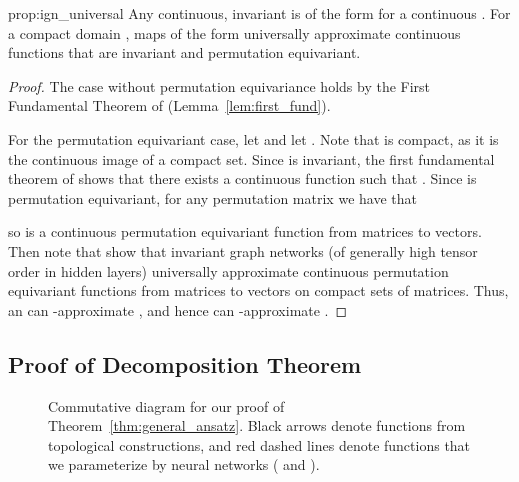 \documentclass{article} \usepackage{iclr2023_conference,times}
\newcommand{\RR}{\mathbb R}
\newcommand{\mc}[1]{\mathcal{#1}}
\newcommand{\mrm}[1]{\mathrm{#1}}
\newcommand{\dout}{d_{\mrm{out}}}
\begin{document}
\begin{repproposition}{prop:ign_universal}
    Any continuous,  invariant  is of the form  for a continuous . For a compact domain , maps of the form  universally approximate continuous functions  that are  invariant and permutation equivariant.
\end{repproposition}


\begin{proof}
    The case without permutation equivariance holds by the First Fundamental Theorem of  (Lemma~\ref{lem:first_fund}).
    
    For the permutation equivariant case, let  and let . Note that  is compact, as it is the continuous image of a compact set. Since  is  invariant, the first fundamental theorem of  shows that there exists a continuous function  such that . Since  is permutation equivariant, for any permutation matrix  we have that
    
    so  is a continuous permutation equivariant function from matrices to vectors. Then note that \cite{keriven2019universal} show that invariant graph networks (of generally high tensor order in hidden layers) universally approximate continuous permutation equivariant functions from matrices to vectors on compact sets of matrices.  Thus, an  can -approximate , and hence  can -approximate .
\end{proof}

\subsection{Proof of Decomposition Theorem}\label{appendix:general_ansatz}

\begin{figure}[ht]
    \centering
    \caption{Commutative diagram for our proof of Theorem~\ref{thm:general_ansatz}. Black arrows denote functions from topological constructions, and red dashed lines denote functions that we parameterize by neural networks ( and ).}
    \label{fig:cd_general_ansatz}
\end{figure}
\end{document}
